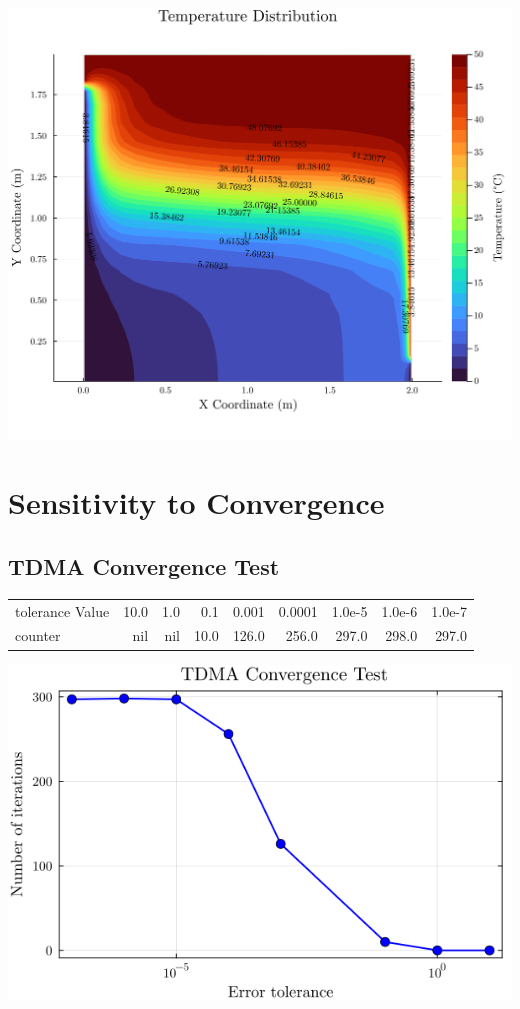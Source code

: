 \documentclass[11pt,twocolumn]{article}
\begin{document}
\begin{center}
\includegraphics[width=.9\linewidth]{./result1.png}
\end{center}
\section{Sensitivity to Convergence}
\label{sec:orga8ab013}

\subsection{TDMA Convergence Test}
\label{sec:org33d2d2c}
\begin{center}
\begin{tabular}{lrrrrrrrr}
tolerance Value & 10.0 & 1.0 & 0.1 & 0.001 & 0.0001 & 1.0e-5 & 1.0e-6 & 1.0e-7\\
counter & nil & nil & 10.0 & 126.0 & 256.0 & 297.0 & 298.0 & 297.0\\
\end{tabular}
\end{center}
\begin{center}
\includegraphics[width=.9\linewidth]{./conv.png}
\end{center}
\end{document}

